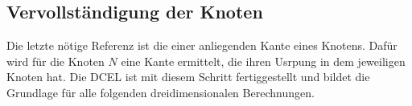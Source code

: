 \subsection{Vervollständigung der Knoten}
Die letzte nötige Referenz ist die einer anliegenden Kante eines Knotens.
Dafür wird für die Knoten $N$ eine Kante ermittelt, die ihren Usrpung in dem jeweiligen Knoten hat.
Die DCEL ist mit diesem Schritt fertiggestellt und bildet die Grundlage für alle folgenden dreidimensionalen Berechnungen.\label{key}
